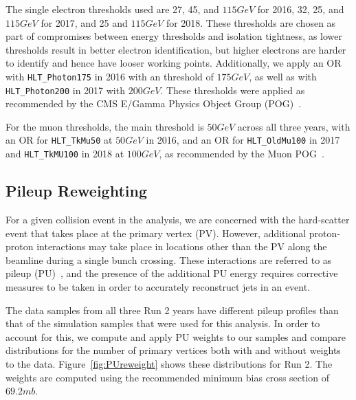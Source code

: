 %  

The single electron \pt thresholds used are 27, 45, and $115\unit{GeV}$ for 2016, 32, 25, and $115\unit{GeV}$ for 2017, and 25 and $115\unit{GeV}$ for 2018.
These thresholds are chosen as part of compromises between energy thresholds and isolation tightness, as lower \pt thresholds result in better electron identification, but higher \pt electrons are harder to identify and hence have looser working points.
Additionally, we apply an OR with \texttt{HLT\_Photon175} in 2016 with an \Et threshold of $175\unit{GeV}$, as well as with \texttt{HLT\_Photon200} in 2017 with $200\unit{GeV}$. %
These thresholds were applied as recommended by the CMS E/Gamma Physics Object Group (POG)~\cite{MuonPOG}.

For the muon thresholds, the main threshold is $50\unit{GeV}$ across all three years, with an OR for \texttt{HLT\_TkMu50} at $50\unit{GeV}$ in 2016, and an OR for \texttt{HLT\_OldMu100} in 2017 and \texttt{HLT\_TkMU100} in 2018 at $100\unit{GeV}$, as recommended by the Muon POG~\cite{MuonHLT2016,MuonHLT2017,MuonHLT2018}.


\subsection{Pileup Reweighting}

For a given collision event in the analysis, we are concerned with the hard-scatter event that takes place at the primary vertex (PV).
However, additional proton-proton interactions may take place in locations other than the PV along the beamline during a single bunch crossing.
These interactions are referred to as pileup (PU)~\cite{Perloff_2012}, and the presence of the additional PU energy requires corrective measures to be taken in order to accurately reconstruct jets in an event.

The data samples from all three Run 2 years have different pileup profiles than that of the simulation samples that were used for this analysis.
In order to account for this, we compute and apply PU weights to our samples and compare distributions for the number of primary vertices both with and without weights to the data.
Figure~\ref{fig:PUreweight} shows these distributions for Run 2.
The weights are computed using the recommended minimum bias cross section of $69.2\unit{mb}$. %

